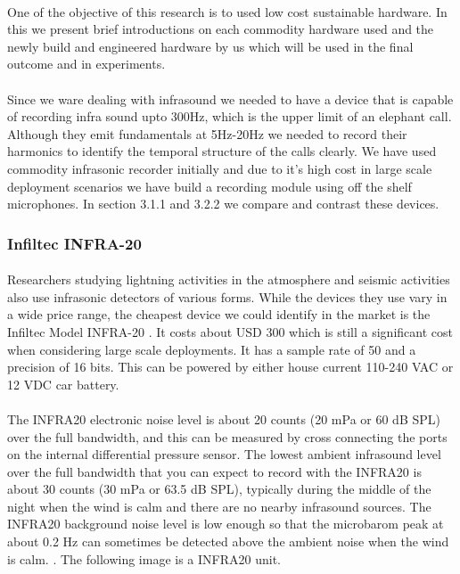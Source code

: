 \documentclass[12pt]{article}
\numberwithin{figure}{section}
\numberwithin{table}{section}
\begin{document}
\paragraph{}
One of the objective of this research is to used low cost sustainable hardware. In this we present brief introductions on each commodity hardware used and the newly build and engineered hardware by us which will be used in the final outcome and in experiments. 

\paragraph{}
Since we ware dealing with infrasound we needed to have a device that is capable of recording infra sound upto 300Hz, which is the upper limit of an elephant call. Although they emit fundamentals at 5Hz-20Hz we needed to record their harmonics to identify the temporal structure of the calls clearly. We have used commodity infrasonic recorder initially and due to it's high cost in large scale deployment scenarios we have build a recording module using off the shelf microphones. In section 3.1.1 and 3.2.2 we compare and contrast these devices. 

\subsubsection{Infiltec INFRA-20}  

\paragraph{}
Researchers studying lightning activities in the atmosphere and seismic activities also use infrasonic detectors of
various forms. While the devices they use vary in a wide price range, the cheapest device we could identify in the market
is the Infiltec Model INFRA-20 \cite{29}. It costs about USD 300 which is still a significant cost when considering large
scale deployments. It has a sample rate of 50 and a precision of 16 bits. This can be powered by either house current 110-240 VAC or 12 VDC car battery. \cite{29}

\paragraph{}
The INFRA20 electronic noise level is about 20 counts (20 mPa or 60 dB SPL) over the full bandwidth, and this can be measured by cross connecting the ports on the internal differential pressure sensor. The lowest ambient infrasound level over the full bandwidth that you can expect to record with the INFRA20 is about 30 counts (30 mPa or 63.5 dB SPL), typically during the middle of the night when the wind is calm and there are no nearby infrasound sources. The INFRA20 background noise level is low enough so that the microbarom peak at about 0.2 Hz can sometimes be detected above the ambient noise when the wind is calm. \cite {29}. The following image is a INFRA20 unit.
\end{document}
